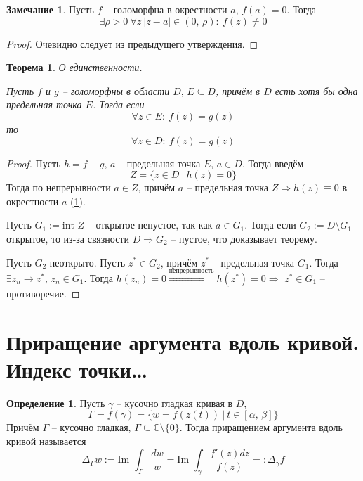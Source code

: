 \documentclass[a4paper,12pt]{article}
\theoremstyle{plain}
\newtheorem{theorem}{Теорема}[section]
\theoremstyle{definition}
\newtheorem{definition}{Определение}[section]
\newtheorem*{note}{Замечание}
\theoremstyle{remark}
\begin{document}
\begin{note}\label{nonZero}
	Пусть $f$ -- голоморфна в окрестности $a,\, f(a) = 0$. Тогда
	\[
		\exists \rho > 0 \: \forall z \: \vert z - a\vert \in (0,\, \rho) :\: f(z) \neq 0
	\]
\end{note}

\begin{proof}
	Очевидно следует из предыдущего утверждения.
\end{proof}

\begin{theorem}
	О единственности.

	Пусть $f$ и $g$ -- голоморфны в области $D,\, E \subseteq D$, причём в $D$ есть хотя бы одна предельная точка $E$. Тогда если
	\[
		\forall z \in E :\: f(z) = g(z)
	\]
	то
	\[
		\forall z \in D :\: f(z) = g(z)
	\]
\end{theorem}

\begin{proof}
	Пусть $h = f - g,\, a $ -- предельная точка $E,\, a \in D$. Тогда введём
	\[
		Z = \{z \in D \:\vert\: h(z) = 0\}
	\]
	Тогда по непрерывности $a \in Z$, причём $a$ -- предельная точка $Z \Rightarrow h(z) \equiv 0$ в окрестности $a$ (\ref{nonZero}).

	Пусть $G_1 := \text{int }Z$ -- открытое непустое, так как $a \in G_1$. Тогда если $G_2 := D \setminus G_1$ открытое, то из-за связности $D \Rightarrow G_2$ -- пустое, что доказывает теорему.

	Пусть $G_2$ неоткрыто. Пусть $z^* \in G_2$, причём $z^*$ -- предельная точка $G_1$. Тогда $\exists z_n \to z^*,\, z_n \in G_1$. Тогда $h(z_n) = 0 \overset{\text{непрерывность}}{\Rightarrow} h(z^*) = 0 \Rightarrow$ $z^* \in G_1$ -- противоречие.
\end{proof}

\section{Приращение аргумента вдоль кривой. Индекс точки\dots}
\begin{definition}
	Пусть $\gamma$ -- кусочно гладкая кривая в $D$,
	\[
		\Gamma = f(\gamma) = \{w = f(z(t)) \:\vert\: t \in [\alpha,\, \beta]\}
	\]
	Причём $\Gamma$ -- кусочно гладкая, $\Gamma \subseteq \mathbb{C}\setminus\{0\}$. Тогда приращением аргумента вдоль кривой называется
	\[
		\Delta_\Gamma w := \text{Im }\int_\Gamma\frac{dw}{w} = \text{Im }\int_\gamma\frac{f'(z)dz}{f(z)} =: \Delta_\gamma f
	\]
\end{definition}
\end{document}
